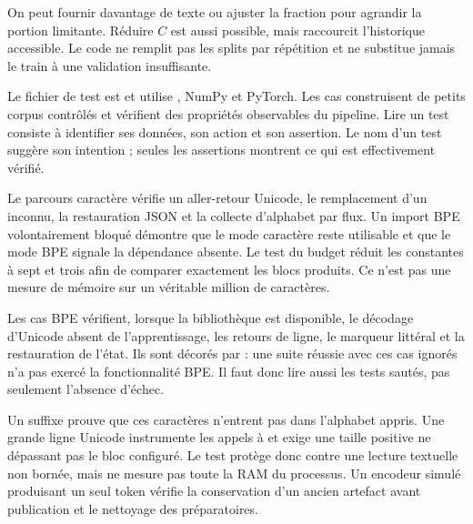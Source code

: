 On peut fournir davantage de texte ou ajuster la fraction pour agrandir
la portion limitante. Réduire \(C\) est aussi possible, mais raccourcit
l'historique accessible. Le code ne remplit pas les splits par répétition
et ne substitue jamais le train à une validation insuffisante.


Le fichier de test est
et utilise , NumPy et PyTorch. Les cas construisent de petits
corpus contrôlés et vérifient des propriétés observables du pipeline.
Lire un test consiste à identifier ses données, son action et son assertion.
Le nom d'un test suggère son intention ; seules les assertions montrent
ce qui est effectivement vérifié.

Le parcours caractère vérifie un aller-retour Unicode, le remplacement
d'un inconnu, la restauration JSON et la collecte d'alphabet par flux.
Un import BPE volontairement bloqué démontre que le mode caractère reste
utilisable et que le mode BPE signale la dépendance absente.
Le test du budget réduit les constantes à sept et trois afin de comparer
exactement les blocs produits. Ce n'est pas une mesure de mémoire
sur un véritable million de caractères.

Les cas BPE vérifient, lorsque la bibliothèque est disponible,
le décodage d'Unicode absent de l'apprentissage, les retours de ligne,
le marqueur littéral et la restauration de l'état.
Ils sont décorés par  : une suite réussie avec ces cas
ignorés n'a pas exercé la fonctionnalité BPE.
Il faut donc lire aussi les tests sautés, pas seulement l'absence d'échec.

Un suffixe  prouve que ces caractères n'entrent pas dans
l'alphabet appris. Une grande ligne Unicode instrumente les appels à
 et exige une taille positive ne dépassant pas le bloc configuré.
Le test protège donc contre une lecture textuelle non bornée,
mais ne mesure pas toute la RAM du processus.
Un encodeur simulé produisant un seul token vérifie la conservation
d'un ancien artefact avant publication et le nettoyage des préparatoires.

